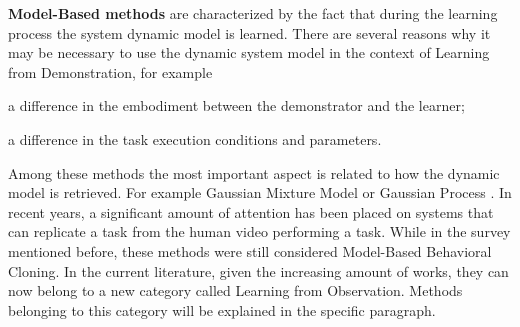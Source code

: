 \textbf{Model-Based methods} are characterized by the fact that during the learning process the system dynamic model is learned. There are several reasons why it may be necessary to use the dynamic system model in the context of Learning from Demonstration, for example \begin{enumerate*}[label=\textbf{(\alph*)}]
    \item a difference in the embodiment between the demonstrator and the learner;
    \item a difference in the task execution conditions and parameters.
\end{enumerate*}
Among these methods the most important aspect is related to how the dynamic model is retrieved. For example Gaussian Mixture Model \cite{grimes2009learning_actions_through_imitation} or Gaussian Process \cite{englert2013probabilistic,deisenroth2014multi_task}. In recent years, a significant amount of attention has been placed on systems that can replicate a task from the human video performing a task. While in the survey mentioned before, these methods were still considered Model-Based Behavioral Cloning. In the current literature, given the increasing amount of works, they can now belong to a new category called Learning from Observation. Methods belonging to this category will be explained in the specific paragraph.  